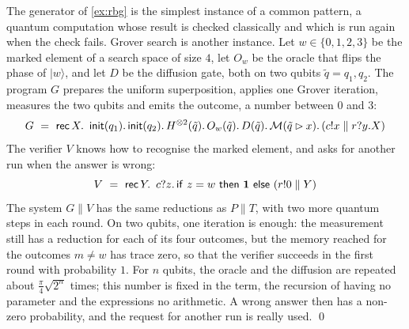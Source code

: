 \begin{example}\label{ex:grover}
The generator of \cref{ex:rbg} is the simplest instance of a common pattern, a quantum
computation whose result is checked classically and which is run again when
the check fails. Grover search is another instance. Let $w \in \{0,1,2,3\}$
be the marked element of a search space of size $4$, let $O_w$ be the oracle
that flips the phase of $|w\rangle$, and let $D$ be the diffusion gate, both
on two qubits $\tilde q = q_1, q_2$. The program $G$ prepares the uniform
superposition, applies one Grover iteration, measures the two qubits and
emits the outcome, a number between $0$ and $3$:
\[
G \ =\ \rec{X}{\ \mathsf{init}(q_1).\,\mathsf{init}(q_2).\,H^{\otimes 2}(\tilde q).\,
       O_w(\tilde q).\,D(\tilde q).\,\M(\tilde q \rhd x).\,
       (c!x \parallel r?y.X)}
\]
The verifier $V$ knows how to recognise the marked element, and asks for
another run when the answer is wrong:
\[
V \ =\ \rec{Y}{\ c?z.\,\ite{z = w}{\mathbf{1}}{(r!0 \parallel Y)}}
\]
The system $G \parallel V$ has the same reductions as $P \parallel T$, with
two more quantum steps in each round. On two qubits, one iteration is enough:
the measurement still has a reduction for each of its four outcomes, but the
memory reached for the outcomes $m \neq w$ has trace zero, so that the
verifier succeeds in the first round with probability $1$. For $n$ qubits,
the oracle and the diffusion are repeated about $\frac{\pi}{4}\sqrt{2^n}$
times; this number is fixed in the term, the recursion of \lqCCS having no
parameter and the expressions no arithmetic. A wrong answer then has a
non-zero probability, and the request for another run is really used.
\qed
\end{example}
